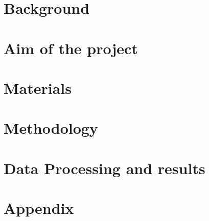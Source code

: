 

\raggedbottom %



\frontmatter	 %


\newpage
\clearpage

\newpage

\tableofcontents*												%

\mainmatter
\chapter{Background} 



\chapter{Aim of the project}


\chapter{Materials}




\chapter{Methodology}



\chapter{Data Processing and results}


\begingroup
\raggedright



%
%

\endgroup

\appendix
\chapter{Appendix}


